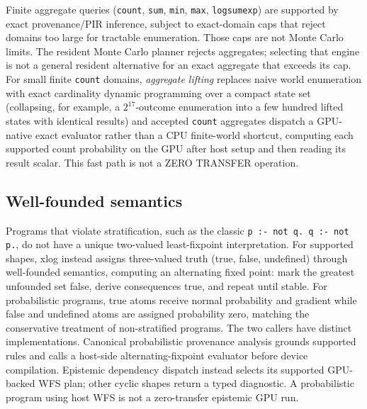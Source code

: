 Finite aggregate queries (\texttt{count}, \texttt{sum}, \texttt{min}, \texttt{max}, \texttt{logsumexp}) are supported by exact provenance/PIR inference, subject to exact-domain caps that reject domains too large for tractable enumeration. Those caps are not Monte Carlo limits. The resident Monte Carlo planner rejects aggregates; selecting that engine is not a general resident alternative for an exact aggregate that exceeds its cap. For small finite \texttt{count} domains, \emph{aggregate lifting} replaces naive world enumeration with exact cardinality dynamic programming over a compact state set (collapsing, for example, a $2^{17}$-outcome enumeration into a few hundred lifted states with identical results) and accepted \texttt{count} aggregates dispatch a GPU-native exact evaluator rather than a CPU finite-world shortcut, computing each supported count probability on the GPU after host setup and then reading its result scalar. This fast path is not a ZERO TRANSFER operation.

\subsection{Well-founded semantics}

Programs that violate stratification, such as the classic \texttt{p :- not q.\ q :- not p.}, do not have a unique two-valued least-fixpoint interpretation. For supported shapes, xlog instead assigns three-valued truth (true, false, undefined) through well-founded semantics, computing an alternating fixed point: mark the greatest unfounded set false, derive consequences true, and repeat until stable. For probabilistic programs, true atoms receive normal probability and gradient while false and undefined atoms are assigned probability zero, matching the conservative treatment of non-stratified programs. The two callers have distinct implementations. Canonical probabilistic provenance analysis grounds supported rules and calls a host-side alternating-fixpoint evaluator before device compilation. Epistemic dependency dispatch instead selects its supported GPU-backed WFS plan; other cyclic shapes return a typed diagnostic. A probabilistic program using host WFS is not a zero-transfer epistemic GPU run.
